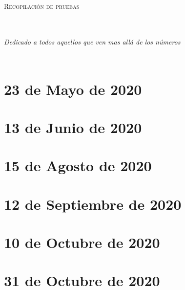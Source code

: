 \documentclass[letterpaper,11pt,oneside]{book}
\theoremstyle{definition}
\theoremstyle{remark}
\begin{document}
	
	\begin{titlepage}
		\begin{center}
			\begin{Huge}
				\textsc{Recopilación de pruebas}
			\end{Huge}
		\end{center}
	\end{titlepage}
	
	\newpage
	$\ $
	\thispagestyle{empty} %
	
	\chapter*{}
	\begin{flushright}
		\textit{Dedicado a todos aquellos que ven mas all\'a de los n\'umeros}
	\end{flushright}
	
	\newpage
	$\ $
	\thispagestyle{empty}
	
	
	\tableofcontents
	
	\newpage
	$\ $
	\thispagestyle{empty} %
	
	
	\chapter{23 de Mayo de 2020}\label{chap:23mayo2020}
	
	
	\chapter{13 de Junio de 2020}\label{chap:13junio2020}
	

	\chapter{15 de Agosto de 2020}\label{chap:15agosto2020}
	
	
	\chapter{12 de Septiembre de 2020}\label{chap:12septiembre2020}
	
	
	\chapter{10 de Octubre  de 2020}\label{chap:10octubre2020}
	
	
	\chapter{31 de Octubre  de 2020}\label{chap:2020_10_31}
	
		
		
\end{document}
